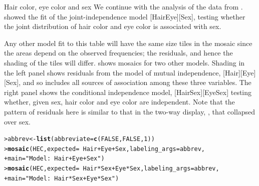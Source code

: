 \documentclass[10pt,krantz2]{krantz}\usepackage[]{graphicx}\usepackage[]{color}
\makeatletter
\newcommand{\hlnum}[1]{\textcolor[rgb]{0.686,0.059,0.569}{#1}}%
\newcommand{\hlstr}[1]{\textcolor[rgb]{0.192,0.494,0.8}{#1}}%
\newcommand{\hlopt}[1]{\textcolor[rgb]{0,0,0}{#1}}%
\newcommand{\hlstd}[1]{\textcolor[rgb]{0.345,0.345,0.345}{#1}}%
\newcommand{\hlkwb}[1]{\textcolor[rgb]{0.69,0.353,0.396}{#1}}%
\newcommand{\hlkwc}[1]{\textcolor[rgb]{0.333,0.667,0.333}{#1}}%
\newcommand{\hlkwd}[1]{\textcolor[rgb]{0.737,0.353,0.396}{\textbf{#1}}}%
\newenvironment{kframe}{%
 \def\at@end@of@kframe{}%
 \ifinner\ifhmode%
  \def\at@end@of@kframe{\end{minipage}}%
  \begin{minipage}{\columnwidth}%
 \fi\fi%
 \def\FrameCommand##1{\hskip\@totalleftmargin \hskip-\fboxsep
 \colorbox{shadecolor}{##1}\hskip-\fboxsep
     \hskip-\linewidth \hskip-\@totalleftmargin \hskip\columnwidth}%
 \MakeFramed {\advance\hsize-\width
   \@totalleftmargin\z@ \linewidth\hsize
   \@setminipage}}%
 {\par\unskip\endMakeFramed%
 \at@end@of@kframe}
\newenvironment{knitrout}{}{} %
\renewenvironment{knitrout}{\small\renewcommand{\baselinestretch}{.85}}{} %
\makeatother
\begin{document}

\begin{Example}[HEC2]{Hair color, eye color and sex}
We continue with the analysis of the  data from
.   showed the fit of the
joint-independence model [HairEye][Sex], testing whether
the joint distribution of hair color and eye color is
associated with sex.

Any other model fit to this table will have the same size tiles in the mosaic
since the areas depend on the observed frequencies;  the residuals,
and hence the shading of the tiles will differ.  
shows mosaics for two other models. Shading in the left panel shows
residuals from the model of mutual independence, [Hair][Eye][Sex], and so
includes all sources of association among these three variables.
The right panel shows the
conditional independence model, [HairSex][EyeSex]
testing whether, given sex, hair color and eye color are independent.
Note that the pattern of residuals here is
similar to that in the two-way display,
, that collapsed over sex.

\begin{knitrout}
\color{fgcolor}\begin{kframe}
\begin{alltt}
\hlstd{> }\hlstd{abbrev} \hlkwb{<-} \hlkwd{list}\hlstd{(}\hlkwc{abbreviate} \hlstd{=} \hlkwd{c}\hlstd{(}\hlnum{FALSE}\hlstd{,} \hlnum{FALSE}\hlstd{,} \hlnum{1}\hlstd{))}
\hlstd{> }\hlkwd{mosaic}\hlstd{(HEC,} \hlkwc{expected} \hlstd{=} \hlopt{~} \hlstd{Hair} \hlopt{+} \hlstd{Eye} \hlopt{+} \hlstd{Sex,} \hlkwc{labeling_args} \hlstd{= abbrev,}
\hlstd{+ }  \hlkwc{main} \hlstd{=} \hlstr{"Model: ~ Hair + Eye + Sex"}\hlstd{)}
\hlstd{> }\hlkwd{mosaic}\hlstd{(HEC,} \hlkwc{expected} \hlstd{=} \hlopt{~} \hlstd{Hair} \hlopt{*} \hlstd{Sex} \hlopt{+} \hlstd{Eye} \hlopt{*} \hlstd{Sex,} \hlkwc{labeling_args} \hlstd{= abbrev,}
\hlstd{+ }        \hlkwc{main}\hlstd{=}\hlstr{"Model: ~ Hair*Sex + Eye*Sex"}\hlstd{)}
\end{alltt}
\end{kframe}\begin{figure}[!htbp]


\end{figure}
\end{knitrout}
\end{Example}
\end{document}
